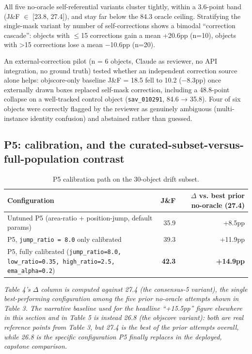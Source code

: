 \documentclass[11pt]{article}
\begin{document}
All five no-oracle self-referential variants cluster tightly, within a 3.6-point band (J\&F $\in$ [23.8, 27.4]), and stay far below the 84.3 oracle ceiling. Stratifying the single-mask variant by number of self-corrections shows a bimodal ``correction cascade'': objects with $\leq$15 corrections gain a mean +20.6pp (n=10), objects with >15 corrections lose a mean $-$10.6pp (n=20).

An external-correction pilot (n = 6 objects, Claude as reviewer, no API integration, no ground truth) tested whether an independent correction source alone helps: objscore-only baseline J\&F = 18.5 fell to 10.2 ($-$8.3pp) once externally drawn boxes replaced self-mask correction, including a 48.8-point collapse on a well-tracked control object (\texttt{sav\_010291}, 84.6 → 35.8). Four of six objects were correctly flagged by the reviewer as genuinely ambiguous (multi-instance identity confusion) and abstained rather than guessed.

\subsection{P5: calibration, and the curated-subset-versus-full-population contrast}

\begin{table}[!htbp]
\centering
\caption{P5 calibration path on the 30-object drift subset.}
\label{tab:4}
\small
\begin{tabularx}{\textwidth}{@{}LrR@{}}
\toprule
Configuration & J\&F & $\Delta$ vs. best prior no-oracle (27.4) \\
\midrule
Untuned P5 (area-ratio + position-jump, default params) & 35.9 & +8.5pp \\
P5, \texttt{jump\_ratio = 8.0} only calibrated & 39.3 & +11.9pp \\
P5, fully calibrated (\texttt{jump\_ratio=8.0, low\_ratio=0.35, high\_ratio=2.5, ema\_alpha=0.2}) & \textbf{42.3} & \textbf{+14.9pp} \\
\bottomrule
\end{tabularx}
\end{table}

\emph{Table 4's $\Delta$ column is computed against 27.4 (the consensus-5 variant), the single best-performing configuration among the five prior no-oracle attempts shown in Table 3. The narrative baseline used for the headline ``+15.5pp'' figure elsewhere in this section and in Table 5 is instead 26.8 (the objscore variant): both are real reference points from Table 3, but 27.4 is the best of the prior attempts overall, while 26.8 is the specific configuration P5 finally replaces in the deployed, capstone comparison.}
\end{document}
